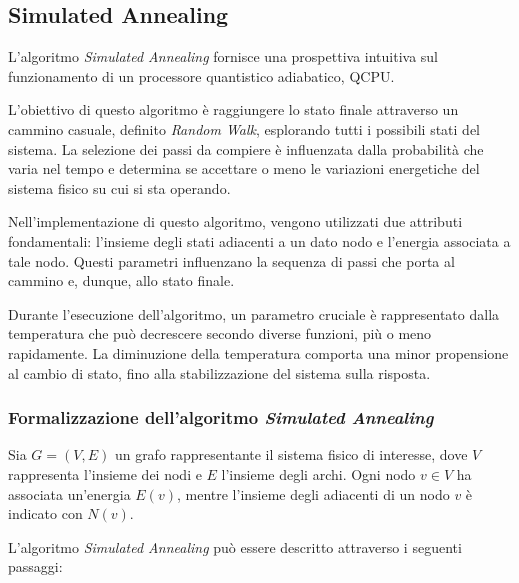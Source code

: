 \documentclass{article}
\begin{document}
\subsection{Simulated Annealing}

L'algoritmo \emph{Simulated Annealing} fornisce una prospettiva intuitiva sul funzionamento di un processore quantistico adiabatico, QCPU.

L'obiettivo di questo algoritmo è raggiungere lo stato finale attraverso un cammino casuale, definito \emph{Random Walk}, esplorando tutti i possibili stati del sistema. La selezione dei passi da compiere è influenzata dalla probabilità che varia nel tempo e determina se accettare o meno le variazioni energetiche del sistema fisico su cui si sta operando.

Nell'implementazione di questo algoritmo, vengono utilizzati due attributi fondamentali: l'insieme degli stati adiacenti a un dato nodo e l'energia associata a tale nodo. Questi parametri influenzano la sequenza di passi che porta al cammino e, dunque, allo stato finale.

Durante l'esecuzione dell'algoritmo, un parametro cruciale è rappresentato dalla temperatura che può decrescere secondo diverse funzioni, più o meno rapidamente. La diminuzione della temperatura comporta una minor propensione al cambio di stato, fino alla stabilizzazione del sistema sulla risposta.

\subsubsection*{Formalizzazione dell'algoritmo \emph{Simulated Annealing}}

Sia $G=(V,E)$ un grafo rappresentante il sistema fisico di interesse, dove $V$ rappresenta l'insieme dei nodi e $E$ l'insieme degli archi. Ogni nodo $v \in V$ ha associata un'energia $E(v)$, mentre l'insieme degli adiacenti di un nodo $v$ è indicato con $N(v)$.

L'algoritmo \emph{Simulated Annealing} può essere descritto attraverso i seguenti passaggi:
\end{document}
